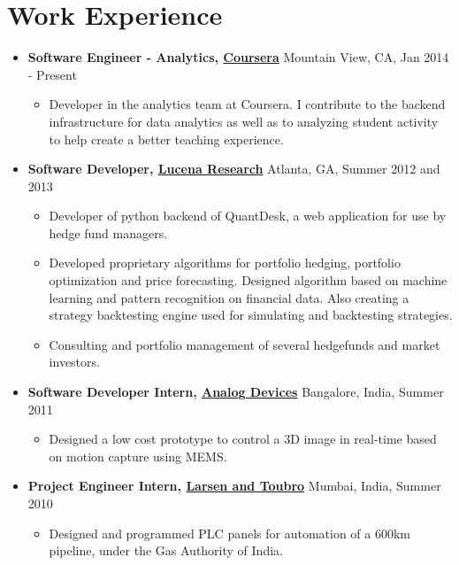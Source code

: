 \documentclass[letterpaper,11pt]{article}
\newcommand{\resitem}[1]{\item #1 \vspace{-2pt}}
\newcommand{\ressubheading}[4]{\textbf{#3, #1} \hfill \small{#2, #4} \vspace{-8pt}}
\begin{document}
\vspace{1pt}
\section{Work Experience}
\begin{itemize}
        \item 
            \ressubheading{\href{http://www.coursera.org}{Coursera}}{Mountain View, CA}{Software Engineer - Analytics}{Jan 2014 - Present}
                { \small
                \begin{itemize}
                    \resitem{Developer in the analytics team at Coursera. I contribute to the backend infrastructure for data analytics as well as to analyzing student activity to help create a better teaching experience.}
                \end{itemize}
                }
        \item 
            \ressubheading{\href{http://www.lucenaresearch.com}{Lucena Research}}{Atlanta, GA}{Software Developer}{Summer 2012 and 2013}
                { \small
                \begin{itemize}
                    \resitem{Developer of python backend of QuantDesk, a web application for use by hedge fund managers.}
                    \resitem{Developed proprietary algorithms for portfolio hedging,  portfolio optimization and price forecasting. Designed algorithm based on machine learning and pattern recognition on financial data. Also creating a strategy backtesting engine used for simulating and backtesting strategies.}
                    \resitem{Consulting and portfolio management of several hedgefunds and market investors.}
                \end{itemize}
                }
        \item 
            \ressubheading{\href{http://www.analog.com}{Analog Devices}}{Bangalore, India}{Software Developer Intern}{Summer 2011}
                { \small
                \begin{itemize}
                    \resitem{Designed a low cost prototype to control a 3D image in real-time based on motion capture using MEMS.}
                \end{itemize}
                }
        \item 
            \ressubheading{\href{http://www.larsentoubro.com}{Larsen and Toubro}}{Mumbai, India}{Project Engineer Intern}{Summer 2010}
                { \small
                \begin{itemize}
                    \resitem{Designed and programmed PLC panels for automation of a 600km pipeline, under the Gas Authority of India.}
                \end{itemize}
                }
    \end{itemize} %
\end{document}

